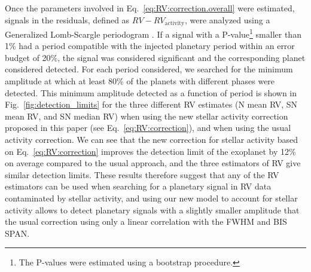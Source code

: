 \documentclass{aa}
\newcommand{\jessi}[1]{{\color{Purple}[[\textbf{Jessi: }#1]]}}
\begin{document}
%

Once the parameters involved in Eq.~\eqref{eq:RV:correction.overall} were estimated,  signals in the residuals, defined as $RV - RV_{\text{activity}}$, were analyzed using a Generalized Lomb-Scargle periodogram \citep[][]{Lomb-1976a, Scargle-1982, Zechmeister-2009}. 
If a signal with a P-value\footnote{The P-values were estimated using a bootstrap procedure.} smaller than 1\% had a period compatible with the injected planetary period within an error budget of 20\%, the signal was considered significant and the corresponding planet considered detected.  
For each period considered, we searched for the minimum amplitude at which at least 80\% of the planets with different phases were detected.
This minimum amplitude detected as a function of period is shown in Fig.~\ref{fig:detection_limits} for the three different RV estimates (N mean RV, SN mean RV, and SN median RV) when using the new stellar activity correction proposed in this paper (see Eq.~\eqref{eq:RV:correction}), and when using the usual activity correction.
We can see that the new correction for stellar activity based on Eq.~\eqref{eq:RV:correction} improves the detection limit of the exoplanet by 12\% on average compared to the usual approach, and the three estimators of RV give similar detection limits.
These results therefore suggest that any of the RV estimators can be used when searching for a planetary signal in RV data contaminated by stellar activity, and using our new model to account for stellar activity allows to detect planetary signals with a slightly smaller amplitude that the usual correction using only a linear correlation with the FWHM and BIS SPAN.
\end{document}
